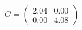 \documentclass[preview]{standalone}
\begin{document}
\begin{align*}
G = \begin{pmatrix} 2.04 & 0.00 \\ 0.00 & 4.08 \end{pmatrix}
\end{align*}
\end{document}
